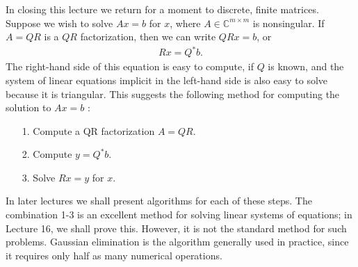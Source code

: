 In closing this lecture we return for a moment to discrete, finite matrices. Suppose we wish to solve $A x=b$ for $x$, where $A \in \mathbb{C}^{m \times m}$ is nonsingular. If $A=Q R$ is a $Q R$ factorization, then we can write $Q R x=b$, or
\begin{align*}
R x=Q^* b .
\end{align*}
The right-hand side of this equation is easy to compute, if $Q$ is known, and the system of linear equations implicit in the left-hand side is also easy to solve because it is triangular. This suggests the following method for computing the solution to $A x=b$ :
\begin{itemize}
    \item [1.] Compute a QR factorization $A=Q R$.
    \item [2.] Compute $y=Q^* b$.
    \item [3.] Solve $R x=y$ for $x$.
\end{itemize}
In later lectures we shall present algorithms for each of these steps.
The combination 1-3 is an excellent method for solving linear systems of equations; in Lecture 16, we shall prove this. However, it is not the standard method for such problems. Gaussian elimination is the algorithm generally used in practice, since it requires only half as many numerical operations.